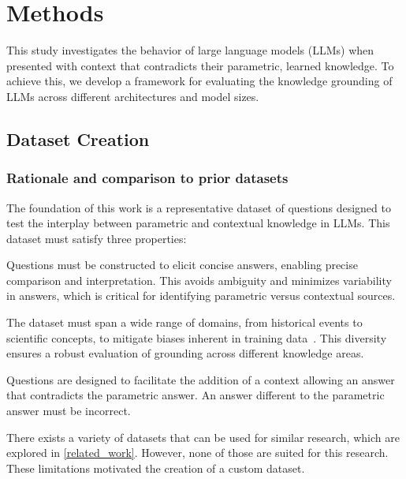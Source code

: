 \section{Methods}
\label{methodology_section}

This study investigates the behavior of large language models (LLMs) when presented with context that contradicts their parametric, learned knowledge.
To achieve this, we develop a framework for evaluating the knowledge grounding of LLMs across different architectures and model sizes.

\subsection{Dataset Creation}
\label{dataset_creation}

\subsubsection{Rationale and comparison to prior datasets}

The foundation of this work is a representative dataset of questions designed to test the interplay between parametric and contextual knowledge in LLMs.
This dataset must satisfy three properties:
\begin{description}[style=nextline]
	\item[1. Short, unambiguous answers] Questions must be constructed to elicit concise answers, enabling precise comparison and interpretation.
This avoids ambiguity and minimizes variability in answers, which is critical for identifying parametric versus contextual sources.
	\item[2. Coverage of diverse topics] The dataset must span a wide range of domains, from historical events to scientific concepts, to mitigate biases inherent in training data~\cite{wikipedia_geographic_bias}.
	This diversity ensures a robust evaluation of grounding across different knowledge areas.
	\item[3. Conterparametric compatibility] Questions are designed to facilitate the addition of a context allowing an answer that contradicts the parametric answer.
		An answer different to the parametric answer must be incorrect.
\end{description}

There exists a variety of datasets that can be used for similar research, which are explored in \cref{related_work}.
However, none of those are suited for this research.
These limitations motivated the creation of a custom dataset.

